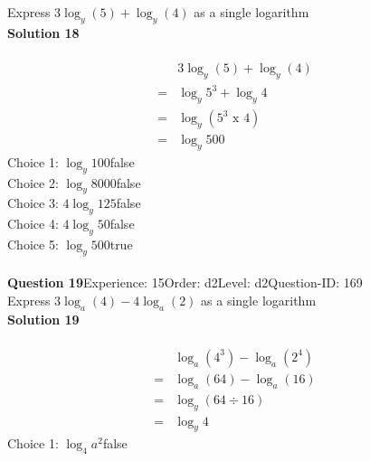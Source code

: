 \documentclass{article}
\begin{document}
Express $3\log_{y}(5)+\log_{y}(4)$ as a single logarithm\\[4pt]
\noindent\textbf{Solution 18}\\[2pt]
\\[-35pt]\begin{align*}
&3\log_{y}(5)+\log_{y}(4)\\[2pt]
=&\log_{y}5^3+\log_{y}4\\[2pt]
=&\log_{y}(5^3 \,\, \text{x} \,\, 4)\\[2pt]
=&\log_{y}500
\end{align*}
Choice 1: \hspace{20pt}$\log_{y}100$\hspace{20pt}false\\
Choice 2: \hspace{20pt}$\log_{y}8000$\hspace{20pt}false\\
Choice 3: \hspace{20pt}$4\log_{y}125$\hspace{20pt}false\\
Choice 4: \hspace{20pt}$4\log_{y}50$\hspace{20pt}false\\
Choice 5: \hspace{20pt}$\log_{y}500$\hspace{20pt}true\\
\\[4pt]
\noindent\textbf{Question 19}\hspace{20pt}Experience: 15\hspace{20pt}Order: d2\hspace{20pt}Level: d2\hspace{20pt}Question-ID: 169\\[2pt]
Express $3\log_{a}(4)-4\log_{a}(2)$ as a single logarithm\\[4pt]
\noindent\textbf{Solution 19}\\[2pt]
\\[-35pt]\begin{align*}
&\log_{a}(4^3)-\log_{a}(2^4)\\[2pt]
=&\log_{a}(64)-\log_{a}(16)\\[2pt]
=&\log_{y}(64 \div 16)\\[2pt]
=&\log_{y}4
\end{align*}
Choice 1: \hspace{20pt}$\log_{4}a^2$\hspace{20pt}false\\
\end{document}
